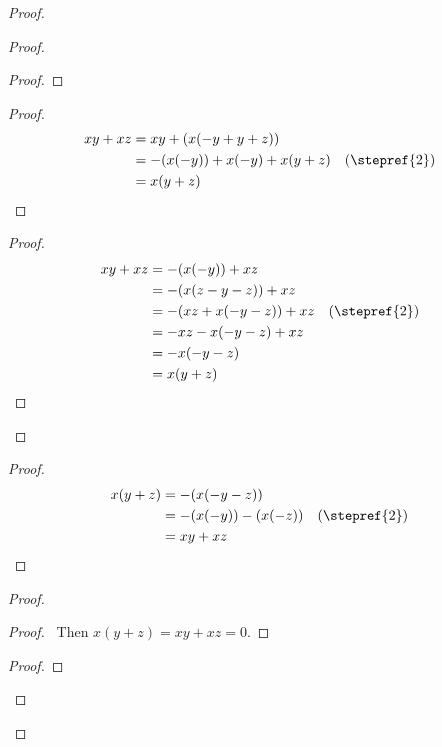 \documentclass{article}
\theoremstyle{definition}
\begin{document}
\begin{proof}
\begin{proof}
            \begin{proof}
            \end{proof}
            \begin{proof}
                \pf
                \begin{align*}
                    xy + xz & = xy + (x(-y + y + z)) \\
                    & = -(x(-y)) + x(-y) + x(y+z) & (\text{\stepref{2}})\\
                    & = x(y+z)
                \end{align*}
            \end{proof}
            \begin{proof}
                \pf
                \begin{align*}
                    xy + xz & = -(x(-y)) + xz \\
                    & = -(x(z-y-z)) + xz \\
                    & = -(xz + x(-y-z)) + xz & (\text{\stepref{2}})\\
                    & = -xz - x(-y-z) + xz \\
                    & = -x(-y-z) \\
                    & = x(y+z)
                \end{align*}
            \end{proof}
        \end{proof}
        \begin{proof}
            \pf
            \begin{align*}
                x(y+z) & = -(x(-y-z)) \\
                & = -(x(-y))-(x(-z)) & (\text{\stepref{2}}) \\
                & = xy + xz
            \end{align*}
        \end{proof}
        \begin{proof}
            \begin{proof}
                \pf\ Then $x(y+z) = xy+xz = 0$.
            \end{proof}
            \begin{proof}

\end{proof}
\end{proof}
\end{proof}
\end{document}

